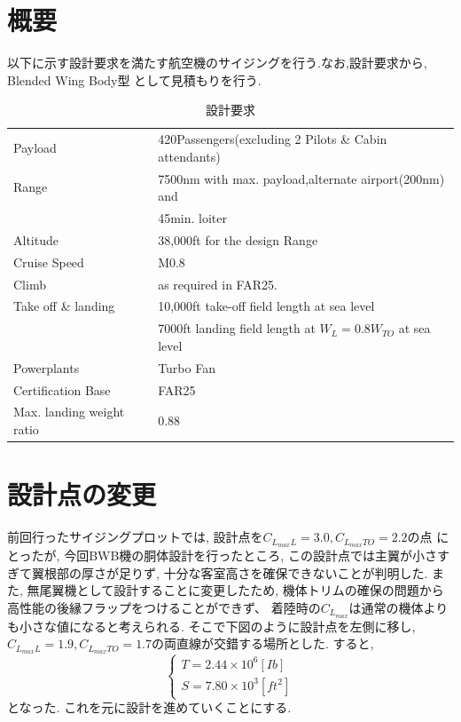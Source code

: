 \documentclass[class=article, crop=false, dvipdfmx, fleqn]{standalone}
\begin{document}
\section{概要}
  以下に示す設計要求を満たす航空機のサイジングを行う.なお,設計要求から, Blended Wing Body型
  として見積もりを行う.
  \begin{table}[H]
    \begin{center}
      \caption{設計要求}
      \begin{tabular}{l l} \hline
        Payload & 420Passengers(excluding 2 Pilots \& Cabin attendants) \\
        Range & 7500nm with max. payload,alternate airport(200nm) and \\
              & 45min. loiter \\
        Altitude & 38,000ft for the design Range \\
        Cruise Speed & M0.8 \\
        Climb & as required in FAR25. \\
        Take off \& landing & 10,000ft take-off field length at sea level \\
                 & 7000ft landing field length at $W_L=0.8W_{TO}$ at sea level \\
        Powerplants & Turbo Fan \\
        Certification Base & FAR25 \\
        Max. landing weight ratio & 0.88 \\  \hline
      \end{tabular}
    \end{center}
    \label{requirements}
  \end{table}

\section{設計点の変更}
前回行ったサイジングプロットでは, 設計点を$C_{L_{max}L} = 3.0, C_{L_{max}TO} = 2.2$の点
にとったが, 今回BWB機の胴体設計を行ったところ, この設計点では主翼が小さすぎて翼根部の厚さが足りず,
十分な客室高さを確保できないことが判明した. また, 無尾翼機として設計することに変更したため,
機体トリムの確保の問題から高性能の後縁フラップをつけることができず、
着陸時の$C_{L_{max}}$は通常の機体よりも小さな値になると考えられる. そこで下図のように設計点を左側に移し,
$C_{L_{max}L} = 1.9, C_{L_{max}TO} = 1.7$の両直線が交錯する場所とした. すると,
\begin{equation}
  \begin{cases}
    T = 2.44 \times 10^6 [Ib] \\
    S = 7.80 \times 10^3 [ft^2]
  \end{cases}
\end{equation}
となった. これを元に設計を進めていくことにする.
\end{document}
